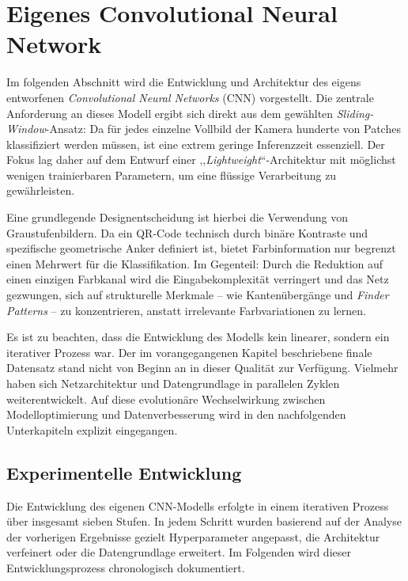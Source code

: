 \documentclass[
    a4paper,        %
    11pt,           %
    ngerman,        %
    parskip=half,   %
    listof=totoc,   %
    bibliography=totoc %
]{scrartcl}
\let\oldsection\section
\renewcommand\section{\clearpage\oldsection}
\begin{document}
\section{Eigenes Convolutional Neural Network} \label{sec:eigenes_cnn}

Im folgenden Abschnitt wird die Entwicklung und Architektur des eigens entworfenen \textit{Convolutional Neural Networks} (CNN) vorgestellt. Die zentrale Anforderung an dieses Modell ergibt sich direkt aus dem gewählten \textit{Sliding-Window}-Ansatz: Da für jedes einzelne Vollbild der Kamera hunderte von Patches klassifiziert werden müssen, ist eine extrem geringe Inferenzzeit essenziell. Der Fokus lag daher auf dem Entwurf einer ,,\textit{Lightweight}``-Architektur mit möglichst wenigen trainierbaren Parametern, um eine flüssige Verarbeitung zu gewährleisten.

Eine grundlegende Designentscheidung ist hierbei die Verwendung von Graustufenbildern. Da ein QR-Code technisch durch binäre Kontraste und spezifische geometrische Anker definiert ist, bietet Farbinformation nur begrenzt einen Mehrwert für die Klassifikation. Im Gegenteil: Durch die Reduktion auf einen einzigen Farbkanal wird die Eingabekomplexität verringert und das Netz gezwungen, sich auf strukturelle Merkmale – wie Kantenübergänge und \textit{Finder Patterns} – zu konzentrieren, anstatt irrelevante Farbvariationen zu lernen.

Es ist zu beachten, dass die Entwicklung des Modells kein linearer, sondern ein iterativer Prozess war. Der im vorangegangenen Kapitel beschriebene finale Datensatz stand nicht von Beginn an in dieser Qualität zur Verfügung. Vielmehr haben sich Netzarchitektur und Datengrundlage in parallelen Zyklen weiterentwickelt. Auf diese evolutionäre Wechselwirkung zwischen Modelloptimierung und Datenverbesserung wird in den nachfolgenden Unterkapiteln explizit eingegangen.

\subsection{Experimentelle Entwicklung} \label{subsec:experimentelle_entwicklung_cnn}

Die Entwicklung des eigenen CNN-Modells erfolgte in einem iterativen Prozess über insgesamt sieben Stufen. In jedem Schritt wurden basierend auf der Analyse der vorherigen Ergebnisse gezielt Hyperparameter angepasst, die Architektur verfeinert oder die Datengrundlage erweitert.
Im Folgenden wird dieser Entwicklungsprozess chronologisch dokumentiert.
\end{document}
